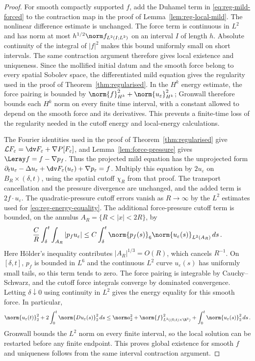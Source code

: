 \documentclass[11pt,reqno]{amsart}
\begin{document}
\begin{proof}
For smooth compactly supported $f$, add the Duhamel term in
\eqref{eq:reg-mild-forced} to the contraction map in the proof of
Lemma~\ref{lem:reg-local-mild}. The nonlinear difference estimate is
unchanged. The force term is continuous in $L^2$ and has norm at most
$h^{1/2}\norm f_{L^2(I;L^2)}$ on an interval $I$ of length $h$. Absolute
continuity of the integral of $|f|^2$ makes this bound uniformly small on
short intervals. The same contraction argument therefore gives local
existence and uniqueness. Since the mollified initial datum and the smooth
force belong to every spatial Sobolev space, the differentiated mild
equation gives the regularity used in the proof of
Theorem~\ref{thm:regularised}. In the $H^k$ energy estimate, the force
pairing is bounded by $\norm{f}_{H^k}^2+\norm{u_\varepsilon}_{H^k}^2$;
Gronwall therefore bounds each $H^k$ norm on every finite time interval,
with a constant allowed to depend on the smooth force and its derivatives.
This prevents a finite-time loss of the regularity needed in the cutoff
energy and local-energy calculations.

The Fourier identities used in the proof of
Theorem~\ref{thm:regularised} give
$\mathcal L F_\varepsilon=\dv F_\varepsilon+\nabla P[F_\varepsilon]$,
and Lemma~\ref{lem:force-pressure} gives
$\Leray f=f-\nabla p_f$. Thus the projected mild equation has the
unprojected form
$\partial_tu_\varepsilon-\Delta u_\varepsilon+
\dv F_\varepsilon(u_\varepsilon)+\nabla p_\varepsilon=f$.
Multiply this equation by $2u_\varepsilon$ on
$B_R\times(\delta,t)$, using the spatial cutoff $\chi_R$ from that proof.
The transport cancellation and the pressure divergence are unchanged, and
the added term is $2f\cdot u_\varepsilon$. The quadratic-pressure cutoff errors vanish as
$R\to\infty$ by the $L^2$ estimates used for
\eqref{eq:reg-energy-equality}. The additional force-pressure cutoff term
is bounded, on the annulus $A_R=\{R<|x|<2R\}$, by
\[
 \frac C R\int_\delta^t\int_{A_R}|p_f u_\varepsilon|
 \le C\int_\delta^t
       \norm{p_f(s)}_6\norm{u_\varepsilon(s)}_{L^2(A_R)}\,ds\,.
\]
Here H\"older's inequality contributes $|A_R|^{1/3}=O(R)$, which
cancels $R^{-1}$. On $[\delta,t]$, $p_f$ is bounded in $L^6$ and the
continuous $L^2$ curve $u_\varepsilon(s)$ has uniformly small tails,
so this term tends to zero. The force pairing is integrable by
Cauchy--Schwarz, and the cutoff force integrals converge by dominated
convergence. Letting $\delta\downarrow0$ using continuity in $L^2$
gives the energy equality for this smooth force. In particular,
\begin{equation}\label{eq:reg-energy-forced-gronwall}
 \norm{u_\varepsilon(t)}_2^2
 +2\int_0^t\norm{Du_\varepsilon(s)}_2^2\,ds
 \le \norm a_2^2+\norm{f}_{L^2((0,t)\times\R^3)}^2
       +\int_0^t\norm{u_\varepsilon(s)}_2^2\,ds\,.
\end{equation}
Gronwall bounds the $L^2$ norm on every finite interval, so the local
solution can be restarted before any finite endpoint. This proves global
existence for smooth $f$ and uniqueness follows from the same interval
contraction argument.


\end{proof}
\end{document}

